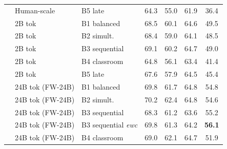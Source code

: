 \documentclass[11pt]{article}
\begin{document}
\begin{table}[!ht]
\begin{minipage}[t]{0.49\linewidth}
\begin{tabular}{ll l cccc}
 & Human-scale & B5 late & \cellcolor[rgb]{0.851,1.000,0.851} 64.3 & \cellcolor[rgb]{0.937,1.000,0.937} 55.0 & \cellcolor[rgb]{0.843,1.000,0.843} 61.9 & \cellcolor[rgb]{1.000,0.850,0.850} 36.4 \\
\addlinespace[1.5pt]
 & 2B tok & B1 balanced & \cellcolor[rgb]{0.807,1.000,0.807} 68.5 & \cellcolor[rgb]{0.873,1.000,0.873} 60.1 & \cellcolor[rgb]{0.807,1.000,0.807} 64.6 & \cellcolor[rgb]{1.000,0.994,0.994} 49.5 \\
 & 2B tok & B2 simult. & \cellcolor[rgb]{0.808,1.000,0.808} 68.4 & \cellcolor[rgb]{0.886,1.000,0.886} 59.0 & \cellcolor[rgb]{0.813,1.000,0.813} 64.1 & \cellcolor[rgb]{1.000,0.983,0.983} 48.5 \\
 & 2B tok & B3 sequential & \cellcolor[rgb]{0.801,1.000,0.801} 69.1 & \cellcolor[rgb]{0.871,1.000,0.871} 60.2 & \cellcolor[rgb]{0.805,1.000,0.805} 64.7 & \cellcolor[rgb]{1.000,0.989,0.989} 49.0 \\
 & 2B tok & B4 classroom & \cellcolor[rgb]{0.846,1.000,0.846} 64.8 & \cellcolor[rgb]{0.923,1.000,0.923} 56.1 & \cellcolor[rgb]{0.823,1.000,0.823} 63.4 & \cellcolor[rgb]{1.000,0.905,0.905} 41.4 \\
 & 2B tok & B5 late & \cellcolor[rgb]{0.817,1.000,0.817} 67.6 & \cellcolor[rgb]{0.900,1.000,0.900} 57.9 & \cellcolor[rgb]{0.808,1.000,0.808} 64.5 & \cellcolor[rgb]{1.000,0.949,0.949} 45.4 \\
 \addlinespace[1.5pt]
 & 24B tok (FW-24B) & B1 balanced & \cellcolor[rgb]{0.796,1.000,0.796} 69.8 & \cellcolor[rgb]{0.856,1.000,0.856} 61.7 & \cellcolor[rgb]{0.804,1.000,0.804} 64.8 & \cellcolor[rgb]{1.000,0.932,0.932} 54.8 \\
 & 24B tok (FW-24B) & B2 simult. & \cellcolor[rgb]{0.792,1.000,0.792} 70.2 & \cellcolor[rgb]{0.849,1.000,0.849} 62.4 & \cellcolor[rgb]{0.804,1.000,0.804} 64.8 & \cellcolor[rgb]{1.000,0.934,0.934} 54.6 \\
 & 24B tok (FW-24B) & B3 sequential & \cellcolor[rgb]{0.811,1.000,0.811} 68.3 & \cellcolor[rgb]{0.859,1.000,0.859} 61.2 & \cellcolor[rgb]{0.816,1.000,0.816} 63.6 & \cellcolor[rgb]{1.000,0.928,0.928} 55.2 \\
 & 24B tok (FW-24B) & B3 sequential {\scriptsize\textit{ewc}} & \cellcolor[rgb]{0.796,1.000,0.796} 69.8 & \cellcolor[rgb]{0.858,1.000,0.858} 61.3 & \cellcolor[rgb]{0.810,1.000,0.810} 64.2 & \cellcolor[rgb]{1.000,0.919,0.919} \textbf{56.1} \\
 & 24B tok (FW-24B) & B4 classroom & \cellcolor[rgb]{0.804,1.000,0.804} 69.0 & \cellcolor[rgb]{0.852,1.000,0.852} 62.1 & \cellcolor[rgb]{0.805,1.000,0.805} 64.7 & \cellcolor[rgb]{1.000,0.961,0.961} 51.9 \\

\end{tabular}
\end{minipage}
\end{table}
\end{document}

